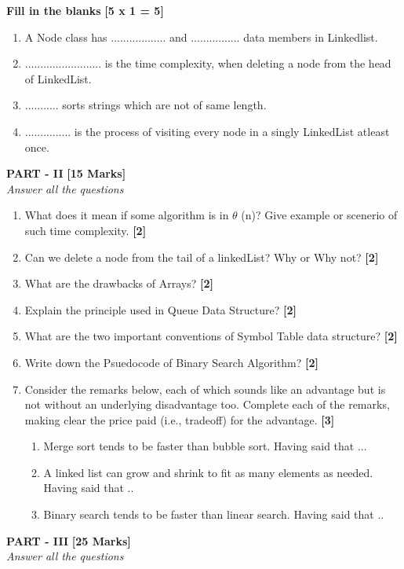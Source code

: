 \documentclass[12pt ,a4paper]{exam}
\begin{document}
	\noindent \textbf{Fill in the blanks} \hfill\textbf{ [5 x 1 = 5]}
	
	\begin{enumerate}[start=5,label={\bfseries Q\arabic*)}]
		\item A Node class has  .................. and ................ data members in Linkedlist.
		\item ......................... is the time complexity, when deleting a node from the head of LinkedList. 
		\item ........... sorts strings which are not of same length.
		\item ............... is the process of visiting every node in a singly LinkedList atleast once.
	\end{enumerate}
	
	\vspace{0.1mm}
	
	\begin{center}
		\textbf{PART - II} \textbf{[15 Marks]}\\
		\noindent \textit{Answer all the questions} 
	\end{center}

	\begin{enumerate}[start=1,label={\bfseries Q\arabic*)}]
		\item What does it mean if some algorithm is in $\theta$ (n)? Give example or scenerio of such time complexity. \hfill \textbf{[2]}
		\item Can we delete a node from the tail of a linkedList? Why or Why not? \hfill \textbf{[2]}
		\item What are the drawbacks of Arrays? \hfill \textbf{[2]}
	    \item Explain the principle used in Queue Data Structure? \hfill \textbf{[2]}
	    \item What are the two important conventions of Symbol Table data structure? \hfill \textbf{[2]}
	    \item Write down the Psuedocode of Binary Search Algorithm? \hfill \textbf{[2]}
	    \item Consider the remarks below, each of which sounds like an advantage but is not without an underlying disadvantage too. Complete each of the remarks, making clear the price paid (i.e., tradeoff) for the advantage. \hfill \textbf{[3]}
	    \begin{enumerate}[start=1,label={\bfseries \roman*)}]
	    	\item Merge sort tends to be faster than bubble sort. Having said that ...
	    	\item A linked list can grow and shrink to fit as many elements as needed. Having said that ..
	    	\item Binary search tends to be faster than linear search. Having said that ..
	    \end{enumerate}
	   
	\end{enumerate}
	\pagebreak
	\begin{center}
		\textbf{PART - III} \textbf{[25 Marks]}\\
		\noindent \textit{Answer all the questions}  
	\end{center}
	
\end{document}

